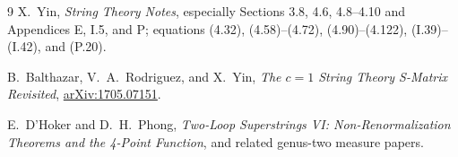 \documentclass[11pt]{article}
\numberwithin{equation}{section}
\begin{document}
\begin{thebibliography}{9}
X.~Yin, \emph{String Theory Notes}, especially Sections 3.8, 4.6, 4.8--4.10
and Appendices E, I.5, and P; equations (4.32), (4.58)--(4.72),
(4.90)--(4.122), (I.39)--(I.42), and (P.20).

B.~Balthazar, V.~A.~Rodriguez, and X.~Yin,
\emph{The $c=1$ String Theory S-Matrix Revisited},
\href{https://arxiv.org/abs/1705.07151}{arXiv:1705.07151}.

E.~D'Hoker and D.~H.~Phong,
\emph{Two-Loop Superstrings VI: Non-Renormalization Theorems and the 4-Point
Function}, and related genus-two measure papers.
\end{thebibliography}
\end{document}
